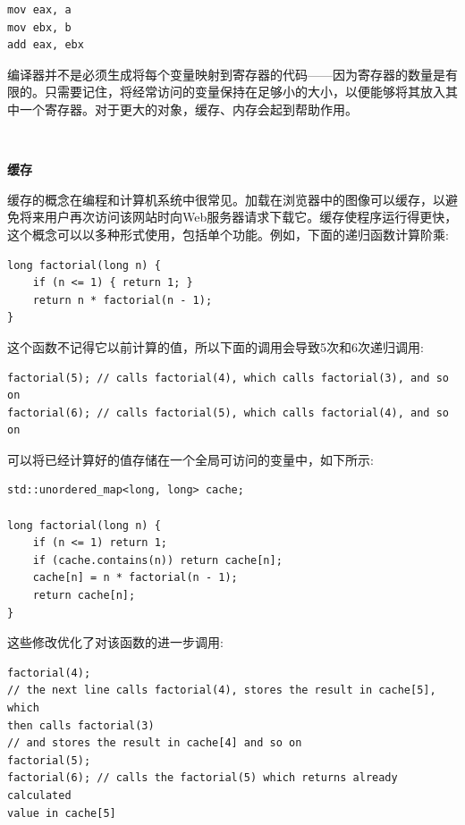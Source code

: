\begin{lstlisting}[caption={}]
mov eax, a
mov ebx, b
add eax, ebx
\end{lstlisting}

编译器并不是必须生成将每个变量映射到寄存器的代码——因为寄存器的数量是有限的。只需要记住，将经常访问的变量保持在足够小的大小，以便能够将其放入其中一个寄存器。对于更大的对象，缓存、内存会起到帮助作用。 \par

\noindent\textbf{}\ \par
\textbf{缓存} \ \par
缓存的概念在编程和计算机系统中很常见。加载在浏览器中的图像可以缓存，以避免将来用户再次访问该网站时向Web服务器请求下载它。缓存使程序运行得更快，这个概念可以以多种形式使用，包括单个功能。例如，下面的递归函数计算阶乘:\par

\begin{lstlisting}[caption={}]
long factorial(long n) {
	if (n <= 1) { return 1; }
	return n * factorial(n - 1);
}
\end{lstlisting}

这个函数不记得它以前计算的值，所以下面的调用会导致5次和6次递归调用: \par

\begin{lstlisting}[caption={}]
factorial(5); // calls factorial(4), which calls factorial(3), and so on
factorial(6); // calls factorial(5), which calls factorial(4), and so on
\end{lstlisting}

可以将已经计算好的值存储在一个全局可访问的变量中，如下所示: \par

\begin{lstlisting}[caption={}]
std::unordered_map<long, long> cache;

long factorial(long n) {
	if (n <= 1) return 1;
	if (cache.contains(n)) return cache[n];
	cache[n] = n * factorial(n - 1);
	return cache[n];
}
\end{lstlisting}

这些修改优化了对该函数的进一步调用: \par

\begin{lstlisting}[caption={}]
factorial(4);
// the next line calls factorial(4), stores the result in cache[5], which
then calls factorial(3)
// and stores the result in cache[4] and so on
factorial(5);
factorial(6); // calls the factorial(5) which returns already calculated
value in cache[5]
\end{lstlisting}

